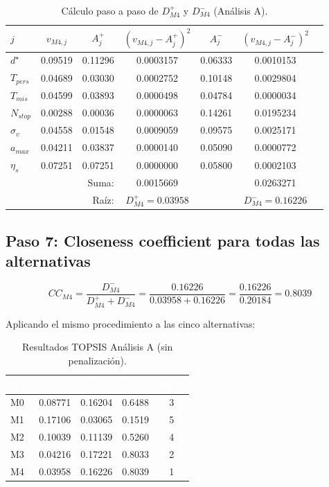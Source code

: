 \documentclass[12pt,a4paper,oneside]{book}
\begin{document}
\begin{table}[H]
\centering
\caption{Cálculo paso a paso de $D_{M4}^+$ y $D_{M4}^-$ (Análisis A).}
\renewcommand{\arraystretch}{1.2}
\small
\begin{tabular}{lcccccc}
\toprule
$j$ & $v_{M4,j}$ & $A^+_j$ & $(v_{M4,j}-A^+_j)^2$ & $A^-_j$ & $(v_{M4,j}-A^-_j)^2$ \\
\midrule
$d^\star$ & 0.09519 & 0.11296 & 0.0003157 & 0.06333 & 0.0010153 \\
$T_{pers}$ & 0.04689 & 0.03030 & 0.0002752 & 0.10148 & 0.0029804 \\
$T_{mis}$ & 0.04599 & 0.03893 & 0.0000498 & 0.04784 & 0.0000034 \\
$N_{stop}$ & 0.00288 & 0.00036 & 0.0000063 & 0.14261 & 0.0195234 \\
$\sigma_v$ & 0.04558 & 0.01548 & 0.0009059 & 0.09575 & 0.0025171 \\
$a_{max}$ & 0.04211 & 0.03837 & 0.0000140 & 0.05090 & 0.0000772 \\
$\eta_s$ & 0.07251 & 0.07251 & 0.0000000 & 0.05800 & 0.0002103 \\
\midrule
\multicolumn{3}{r}{Suma:} & 0.0015669 & & 0.0263271 \\
\multicolumn{3}{r}{Raíz:} & $D^+_{M4} = 0.03958$ & & $D^-_{M4} = 0.16226$ \\
\bottomrule
\end{tabular}
\end{table}

\subsection{Paso 7: Closeness coefficient para todas las alternativas}

\begin{equation}
CC_{M4} = \frac{D^-_{M4}}{D^+_{M4} + D^-_{M4}} = \frac{0.16226}{0.03958 + 0.16226} = \frac{0.16226}{0.20184} = \boxed{0.8039}
\end{equation}

Aplicando el mismo procedimiento a las cinco alternativas:

\begin{table}[H]
\centering
\caption{Resultados TOPSIS Análisis A (sin penalización).}
\renewcommand{\arraystretch}{1.3}
\begin{tabular}{lcccc}
\toprule
\rowcolor{primary}
\textcolor{white}{\textbf{Alt.}} &
\textcolor{white}{\textbf{$D^+$}} &
\textcolor{white}{\textbf{$D^-$}} &
\textcolor{white}{\textbf{$CC$}} &
\textcolor{white}{\textbf{Rank}} \\
\midrule
M0 & 0.08771 & 0.16204 & 0.6488 & 3 \\
M1 & 0.17106 & 0.03065 & 0.1519 & 5 \\
M2 & 0.10039 & 0.11139 & 0.5260 & 4 \\
M3 & 0.04216 & 0.17221 & 0.8033 & 2 \\
M4 & 0.03958 & 0.16226 & 0.8039 & 1 \\
\bottomrule
\end{tabular}
\end{table}
\end{document}

